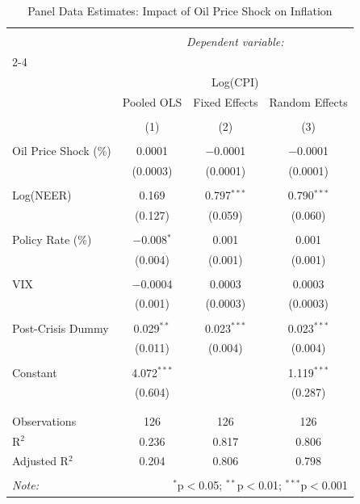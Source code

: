 
\begin{table}[!htbp] \centering 
  \caption{Panel Data Estimates: Impact of Oil Price Shock on Inflation} 
  \label{} 
\begin{tabular}{@{\extracolsep{5pt}}lccc} 
\\[-1.8ex]\hline 
\hline \\[-1.8ex] 
 & \multicolumn{3}{c}{\textit{Dependent variable:}} \\ 
\cline{2-4} 
\\[-1.8ex] & \multicolumn{3}{c}{Log(CPI)} \\ 
 & Pooled OLS & Fixed Effects & Random Effects \\ 
\\[-1.8ex] & (1) & (2) & (3)\\ 
\hline \\[-1.8ex] 
 Oil Price Shock (\%) & 0.0001 & $-$0.0001 & $-$0.0001 \\ 
  & (0.0003) & (0.0001) & (0.0001) \\ 
  & & & \\ 
 Log(NEER) & 0.169 & 0.797$^{***}$ & 0.790$^{***}$ \\ 
  & (0.127) & (0.059) & (0.060) \\ 
  & & & \\ 
 Policy Rate (\%) & $-$0.008$^{*}$ & 0.001 & 0.001 \\ 
  & (0.004) & (0.001) & (0.001) \\ 
  & & & \\ 
 VIX & $-$0.0004 & 0.0003 & 0.0003 \\ 
  & (0.001) & (0.0003) & (0.0003) \\ 
  & & & \\ 
 Post-Crisis Dummy & 0.029$^{**}$ & 0.023$^{***}$ & 0.023$^{***}$ \\ 
  & (0.011) & (0.004) & (0.004) \\ 
  & & & \\ 
 Constant & 4.072$^{***}$ &  & 1.119$^{***}$ \\ 
  & (0.604) &  & (0.287) \\ 
  & & & \\ 
\hline \\[-1.8ex] 
Observations & 126 & 126 & 126 \\ 
R$^{2}$ & 0.236 & 0.817 & 0.806 \\ 
Adjusted R$^{2}$ & 0.204 & 0.806 & 0.798 \\ 
\hline 
\hline \\[-1.8ex] 
\textit{Note:}  & \multicolumn{3}{r}{$^{*}$p$<$0.05; $^{**}$p$<$0.01; $^{***}$p$<$0.001} \\ 
\end{tabular} 
\end{table} 

